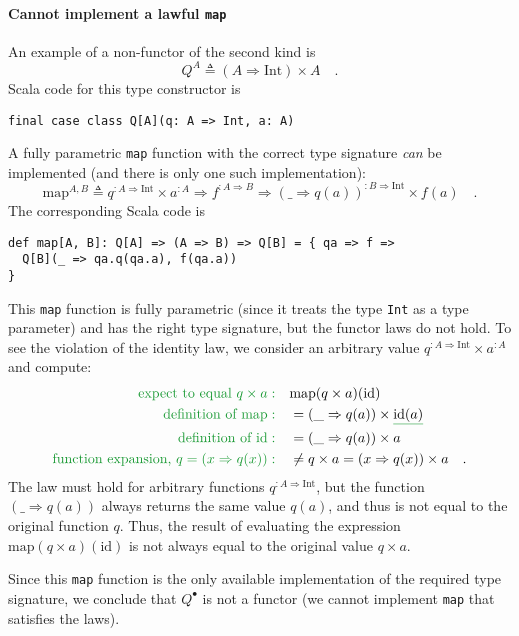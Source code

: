 \paragraph{Cannot implement a lawful \lstinline!map! }

An example of a non-functor of the second kind is 
\[
Q^{A}\triangleq\left(A\Rightarrow\text{Int}\right)\times A\quad.
\]
Scala code for this type constructor is
\begin{lstlisting}
final case class Q[A](q: A => Int, a: A)
\end{lstlisting}
A fully parametric \lstinline!map! function with the correct type
signature \emph{can} be implemented (and there is only one such implementation):
\[
\text{map}^{A,B}\triangleq q^{:A\Rightarrow\text{Int}}\times a^{:A}\Rightarrow f^{:A\Rightarrow B}\Rightarrow(\_\Rightarrow q(a))^{:B\Rightarrow\text{Int}}\times f(a)\quad.
\]
The corresponding Scala code is
\begin{lstlisting}
def map[A, B]: Q[A] => (A => B) => Q[B] = { qa => f =>
  Q[B](_ => qa.q(qa.a), f(qa.a)) 
}
\end{lstlisting}
This \lstinline!map! function is fully parametric (since it treats
the type \lstinline!Int! as a type parameter) and has the right type
signature, but the functor laws do not hold. To see the violation
of the identity law, we consider an arbitrary value $q^{:A\Rightarrow\text{Int}}\times a^{:A}$
and compute:
\begin{align*}
{\color{greenunder}\text{expect to equal }q\times a:}\quad & \text{map}(q\times a)(\text{id})\\
{\color{greenunder}\text{definition of }\text{map}:}\quad & =(\_\Rightarrow q(a))\times\gunderline{\text{id}(a)}\\
{\color{greenunder}\text{definition of }\text{id}:}\quad & =(\_\Rightarrow q(a))\times a\\
{\color{greenunder}\text{function expansion, }q=\left(x\Rightarrow q(x)\right):}\quad & \neq q\times a=(x\Rightarrow q(x))\times a\quad.
\end{align*}
The law must hold for arbitrary functions $q^{:A\Rightarrow\text{Int}}$,
but the function $\left(\_\Rightarrow q(a)\right)$ always returns
the same value $q(a)$, and thus is not equal to the original function
$q$. Thus, the result of evaluating the expression $\text{map}(q\times a)(\text{id})$
is not always equal to the original value $q\times a$. 

Since this \lstinline!map! function is the only available implementation
of the required type signature, we conclude that $Q^{\bullet}$ is
not a functor (we cannot implement \lstinline!map! that satisfies
the laws).


